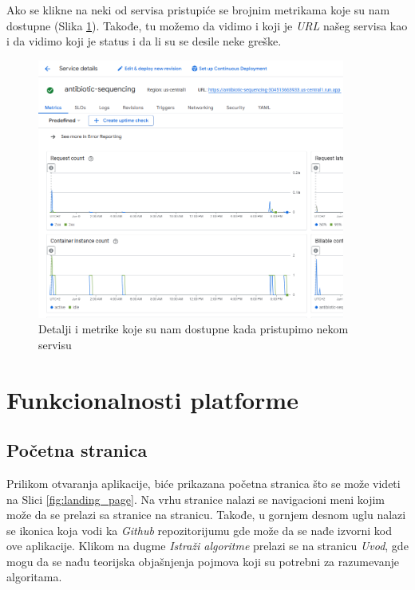 \documentclass[12pt,oneside]{memoir}
\begin{document}
Ako se klikne na neki od servisa pristupiće se brojnim metrikama koje su nam dostupne (Slika \ref{fig:gcr_services_details}). Takođe, tu možemo da vidimo i koji je \emph{URL} našeg servisa kao i da vidimo koji je status i da li su se desile neke greške.

\begin{figure}[h]
\centering
\includegraphics[width=0.9\textwidth]{images/gcr_services_details.png}
\caption{Detalji i metrike koje su nam dostupne kada pristupimo nekom servisu}
\label{fig:gcr_services_details}
\end{figure}


\section{Funkcionalnosti platforme}

\subsection{Početna stranica}

Prilikom otvaranja aplikacije, biće prikazana početna stranica što se može videti na Slici \ref{fig:landing_page}. Na vrhu stranice nalazi se navigacioni meni kojim može da se prelazi sa stranice na stranicu. Takođe, u gornjem desnom uglu nalazi se ikonica koja vodi ka \emph{Github} repozitorijumu gde može da se nađe izvorni kod ove aplikacije.
Klikom na dugme \emph{Istraži algoritme} prelazi se na stranicu \emph{Uvod}, gde mogu da se nađu teorijska objašnjenja pojmova koji su potrebni za razumevanje algoritama.
\end{document}
